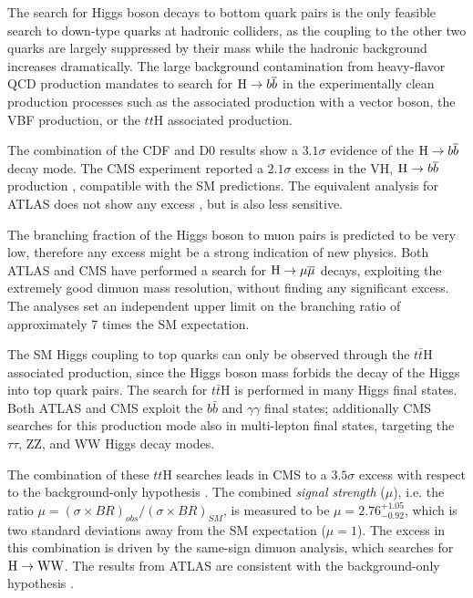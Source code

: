 The search for Higgs boson decays to bottom quark pairs is the only feasible search to down-type quarks at hadronic colliders, as the coupling to the other two quarks are largely suppressed by their mass while the hadronic background increases dramatically. The large background contamination from heavy-flavor QCD production mandates to search for $\mathrm{H}\rightarrow b\overline{b}$ in the experimentally clean production processes such as the associated production with a vector boson, the VBF production, or the $tt$H associated production.

The combination of the CDF and D0 results \cite{Aaltonen:2012qt} show a $3.1\sigma$ evidence of the $\mathrm{H} \rightarrow b \overline{b}$ decay mode. The CMS experiment reported a $2.1\sigma$ excess in the VH, $\mathrm{H} \rightarrow b \overline{b}$ production \cite{Chatrchyan:2013zna}, compatible with the SM predictions. The equivalent analysis for ATLAS does not show any excess \cite{TheATLAScollaboration:2013lia}, but is also less sensitive.

The branching fraction of the Higgs boson to muon pairs is predicted to be very low, therefore any excess might be a strong indication of new physics. Both ATLAS \cite{Aad:2014xva} and CMS \cite{CMS:2013aga} have performed a search for  $\mathrm{H} \rightarrow \mu \overline{\mu}$ decays, exploiting the extremely good dimuon mass resolution, without finding any significant excess. The analyses set an independent upper limit on the branching ratio of approximately 7 times the SM expectation.

The SM Higgs coupling to top quarks can only be observed through the $t\bar{t}$H associated production, since the Higgs boson mass forbids the decay of the Higgs into top quark pairs. The search for $t\bar{t}$H \cite{ATLASCONF:2014043,CMS:2014ega} is performed in many Higgs final states. Both ATLAS and CMS exploit the $b\bar{b}$ and $\gamma\gamma$ final states; additionally CMS searches for this production mode also in multi-lepton final states, targeting the $\tau\tau$, ZZ, and WW Higgs decay modes.

The combination of these $tt$H searches leads in CMS to a $3.5\sigma$ excess with respect to the background-only hypothesis \cite{CMS:2014ega}. The combined \emph{signal strength} ($\mu$), i.e. the ratio $\mu = (\sigma \times BR)_{obs} / (\sigma \times BR)_{SM}$, is measured to be $\mu = 2.76^{+1.05}_{-0.92}$, which is two standard deviations away from the SM expectation ($\mu = 1$). The excess in this combination is driven by the same-sign dimuon analysis, which searches for $\mathrm{H}\rightarrow \mathrm{W}\mathrm{W}$. The results from ATLAS are consistent with the background-only hypothesis \cite{ATLASCONF:2014043}.

